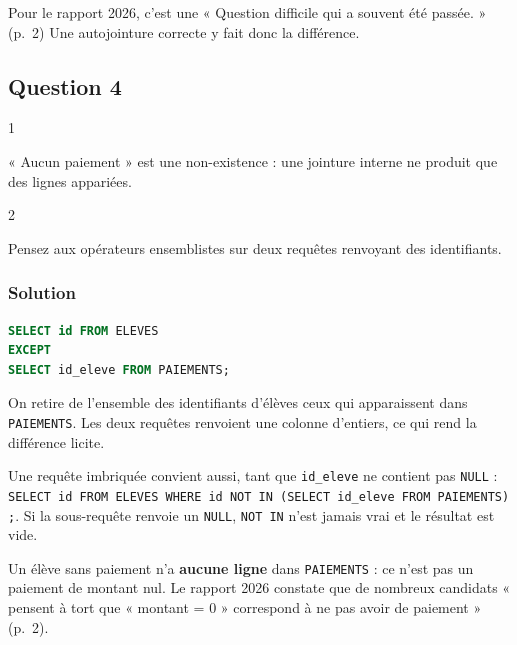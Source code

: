 \documentclass[11pt,a4paper]{article}
\begin{document}
\begin{jury}

Pour le rapport 2026, c'est une « Question difficile qui a souvent été passée. » (p.~2) Une autojointure correcte y fait donc la différence.

\end{jury}

\hypertarget{question-4}{%
\subsection{Question 4}\label{question-4}}

\begin{indication}{1}

« Aucun paiement » est une non-existence : une jointure interne ne produit que des lignes appariées.

\end{indication}

\begin{indication}{2}

Pensez aux opérateurs ensemblistes sur deux requêtes renvoyant des identifiants.

\end{indication}

\hypertarget{solution-3}{%
\subsubsection{Solution}\label{solution-3}}

\begin{lstlisting}[language=SQL]
SELECT id FROM ELEVES
EXCEPT
SELECT id_eleve FROM PAIEMENTS;
\end{lstlisting}

On retire de l'ensemble des identifiants d'élèves ceux qui apparaissent dans \texttt{PAIEMENTS}. Les deux requêtes renvoient une colonne d'entiers, ce qui rend la différence licite.

Une requête imbriquée convient aussi, tant que \texttt{id\_eleve} ne contient pas \texttt{NULL} : \texttt{SELECT\ id\ FROM\ ELEVES\ WHERE\ id\ NOT\ IN\ (\allowbreak{}SELECT\ id\_eleve\ FROM\ PAIEMENTS)\allowbreak{};\allowbreak{}}. Si la sous-requête renvoie un \texttt{NULL}, \texttt{NOT\ IN} n'est jamais vrai et le résultat est vide.

\begin{piege}

Un élève sans paiement n'a \textbf{aucune ligne} dans \texttt{PAIEMENTS} : ce n'est pas un paiement de montant nul. Le rapport 2026 constate que de nombreux candidats « pensent à tort que « montant = 0 » correspond à ne pas avoir de paiement » (p.~2).

\end{piege}
\end{document}
